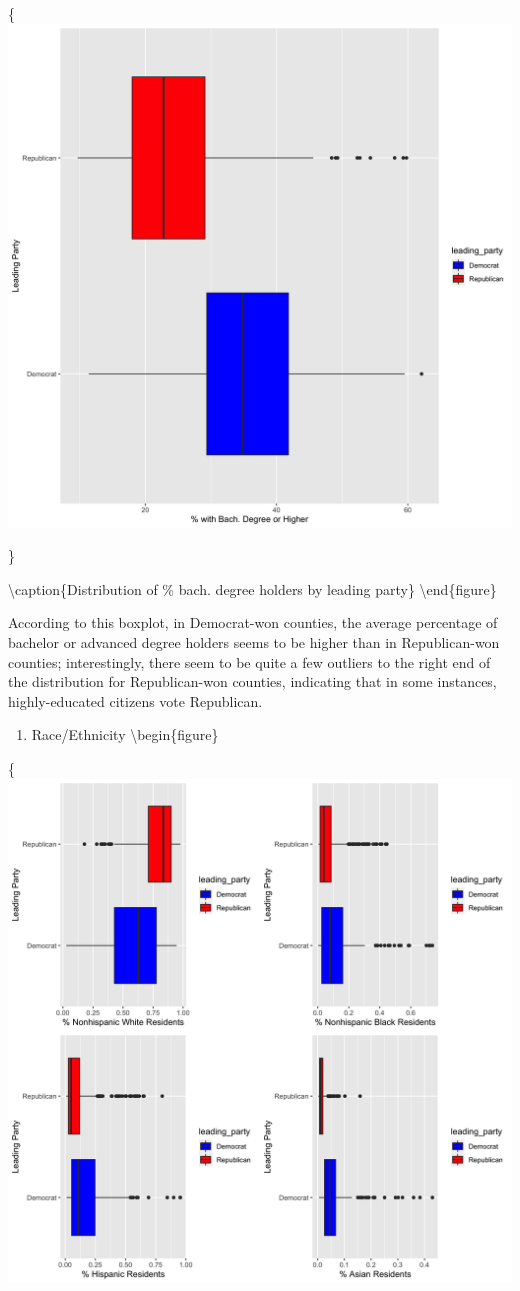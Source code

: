 \documentclass[
]{article}
\providecommand{\tightlist}{%
  \setlength{\itemsep}{0pt}\setlength{\parskip}{0pt}}
\begin{document}
\{\centering \includegraphics[width=0.8\linewidth]{../results/edu-box}

\}

\textbackslash caption\{Distribution of \% bach. degree holders by leading party\}\label{fig:edu-box}
\textbackslash end\{figure\}

According to this boxplot, in Democrat-won counties, the average percentage of bachelor or advanced degree holders seems to be higher than in Republican-won counties; interestingly, there seem to be quite a few outliers to the right end of the distribution for Republican-won counties, indicating that in some instances, highly-educated citizens vote Republican.

\begin{enumerate}
\def\labelenumi{\alph{enumi})}
\setcounter{enumi}{1}
\tightlist
\item
  Race/Ethnicity
  \textbackslash begin\{figure\}
\end{enumerate}

\{\centering \includegraphics[width=0.8\linewidth]{../results/race-plots}
\end{document}
